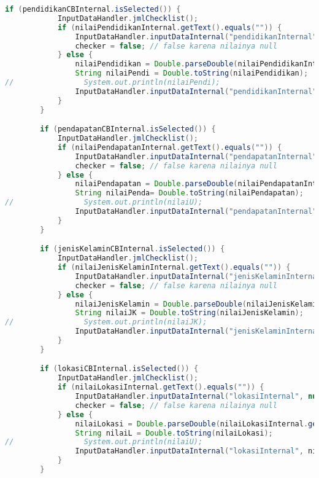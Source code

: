 \begin{lstlisting}[language=Java, caption=TampilanBobotKetetanggaan.java]
        if (pendidikanCBInternal.isSelected()) {
            InputDataHandler.jmlChecklist();
            if (nilaiPendidikanInternal.getText().equals("")) {
                InputDataHandler.inputDataInternal("pendidikanInternal", null);
                checker = false; // false karena nilainya null
            } else {
                nilaiPendidikan = Double.parseDouble(nilaiPendidikanInternal.getText()) / 100.0;
                String nilaiPendi = Double.toString(nilaiPendidikan);
//                System.out.println(nilaiPendi);
                InputDataHandler.inputDataInternal("pendidikanInternal", nilaiPendi);
            }
        }

        if (pendapatanCBInternal.isSelected()) {
            InputDataHandler.jmlChecklist();
            if (nilaiPendapatanInternal.getText().equals("")) {
                InputDataHandler.inputDataInternal("pendapatanInternal", null);
                checker = false; // false karena nilainya null
            } else {
                nilaiPendapatan = Double.parseDouble(nilaiPendapatanInternal.getText()) / 100.0;
                String nilaiPenda= Double.toString(nilaiPendapatan);
//                System.out.println(nilaiU);
                InputDataHandler.inputDataInternal("pendapatanInternal", nilaiPenda);
            }
        }

        if (jenisKelaminCBInternal.isSelected()) {
            InputDataHandler.jmlChecklist();
            if (nilaiJenisKelaminInternal.getText().equals("")) {
                InputDataHandler.inputDataInternal("jenisKelaminInternal", null);
                checker = false; // false karena nilainya null
            } else {
                nilaiJenisKelamin = Double.parseDouble(nilaiJenisKelaminInternal.getText()) / 100.0;
                String nilaiJK = Double.toString(nilaiJenisKelamin);
//                System.out.println(nilaiJK);
                InputDataHandler.inputDataInternal("jenisKelaminInternal", nilaiJK);
            }
        }

        if (lokasiCBInternal.isSelected()) {
            InputDataHandler.jmlChecklist();
            if (nilaiLokasiInternal.getText().equals("")) {
                InputDataHandler.inputDataInternal("lokasiInternal", null);
                checker = false; // false karena nilainya null
            } else {
                nilaiLokasi = Double.parseDouble(nilaiLokasiInternal.getText()) / 100.0;
                String nilaiL = Double.toString(nilaiLokasi);
//                System.out.println(nilaiU);
                InputDataHandler.inputDataInternal("lokasiInternal", nilaiL);
            }
        }


\end{lstlisting}
